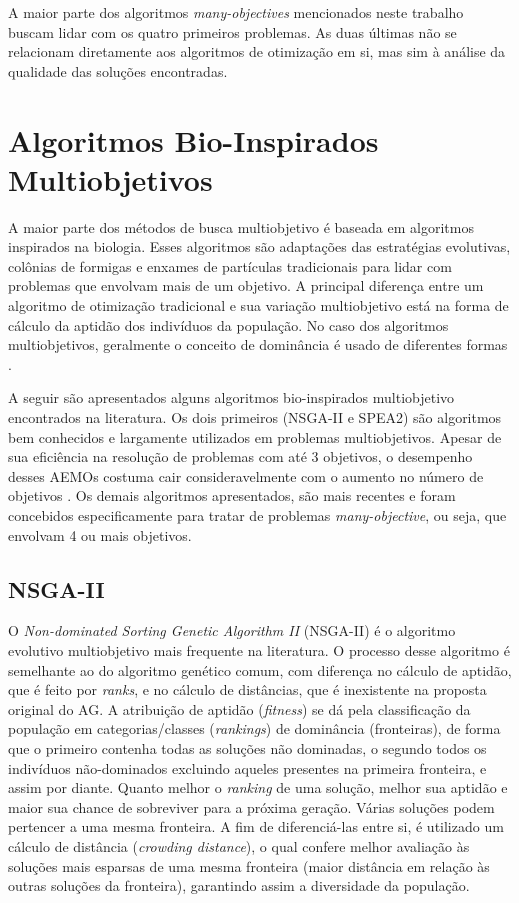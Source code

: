 A maior parte dos algoritmos \textit{many-objectives} mencionados neste trabalho buscam lidar com os quatro primeiros problemas. As duas últimas não se relacionam diretamente aos algoritmos de otimização em si, mas sim à análise da qualidade das soluções encontradas.

\section{Algoritmos Bio-Inspirados Multiobjetivos}
\label{section_bioinspired_algorithms}

A maior parte dos métodos de busca multiobjetivo é baseada em algoritmos inspirados na biologia. Esses algoritmos são adaptações das estratégias evolutivas, colônias de formigas e enxames de partículas tradicionais para lidar com problemas que envolvam mais de um objetivo. A principal diferença entre um algoritmo de otimização tradicional e sua variação multiobjetivo está na forma de cálculo da aptidão dos indivíduos da população. No caso dos algoritmos multiobjetivos, geralmente o conceito de dominância é usado de diferentes formas \cite{Bueno2010}.

A seguir são apresentados alguns algoritmos bio-inspirados multiobjetivo encontrados na literatura. Os dois primeiros (NSGA-II e SPEA2) são algoritmos bem conhecidos e largamente utilizados em problemas multiobjetivos. Apesar de sua eficiência na resolução de problemas com até 3 objetivos, o desempenho desses AEMOs costuma cair consideravelmente com o aumento no número de objetivos \cite{Franca2017}. Os demais algoritmos apresentados, são mais recentes e foram concebidos especificamente para tratar de problemas \textit{many-objective}, ou seja, que envolvam 4 ou mais objetivos.

\subsection{NSGA-II}
O \textit{Non-dominated Sorting Genetic Algorithm II} (NSGA-II) \cite{Deb2002} é o algoritmo evolutivo multiobjetivo mais frequente na literatura. O processo desse algoritmo é semelhante ao do algoritmo genético comum, com diferença no cálculo de aptidão, que é feito por \textit{ranks}, e no cálculo de distâncias, que é inexistente na proposta original do AG. A atribuição de aptidão (\textit{fitness}) se dá pela classificação da população em categorias/classes (\textit{rankings}) de dominância (fronteiras), de forma que o primeiro contenha todas as soluções não dominadas, o segundo todos os indivíduos não-dominados excluindo aqueles presentes na primeira fronteira, e assim por diante. Quanto melhor o \textit{ranking} de uma solução, melhor sua aptidão e  maior sua chance de sobreviver para a próxima geração. Várias soluções podem pertencer a uma mesma fronteira. A fim de diferenciá-las entre si, é utilizado um cálculo de distância (\textit{crowding distance}), o qual confere melhor avaliação às soluções mais esparsas de uma mesma fronteira (maior distância em relação às outras soluções da fronteira), garantindo assim a diversidade da população.

